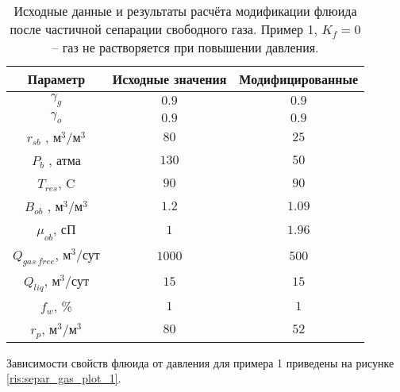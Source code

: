 \begin{table}[h!]
	\caption{Исходные данные и результаты расчёта модификации флюида после частичной сепарации свободного газа. Пример 1, $K_f=0$ -- газ не растворяется при повышении давления.}
	\begin{center}
		\begin{tabular}{ |c|c|c|} 
			\hline
			Параметр & Исходные значения & Модифицированные \\ 
			\hline
			$\gamma_g$ 				&$0.9$	& $0.9$    \\ 
			$\gamma_o$ 					&$0.9$	& $0.9$   \\ 
			$r_{sb}$ ,  м$^3$/м$^3$ 		&$80$	& $25$ \\ 
			$P_b$ , атма 					&$130$	& $50$ 	 \\ 
			$T_{res} $,  C 					&$90$	& $90$ \\ 
			$B_{ob} $ , м$^3$/м$^3$  		&$1.2$	& $1.09$ \\ 
			$\mu_{ob}  $,  сП  				&$1$	& $1.96$   \\ 
			\hline
			$Q_{gas\ free}  $,  м$^3$/сут  	&$1000$	& $500$  \\ 
			$Q_{liq}  $,  м$^3$/сут  			&$15$	& $15$ \\ 
			$f_{w}  $,  \%  					&$1$	& $1$  \\ 
			$r_p  $,  м$^3$/м$^3$  			&$80$	& $52$ \\ 
			\hline
		\end{tabular}
	\end{center}
	\label{table:separ_gas_table_1}
\end{table}

Зависимости свойств флюида от давления для примера 1 приведены на рисунке \ref{ris:separ_gas_plot_1}.

